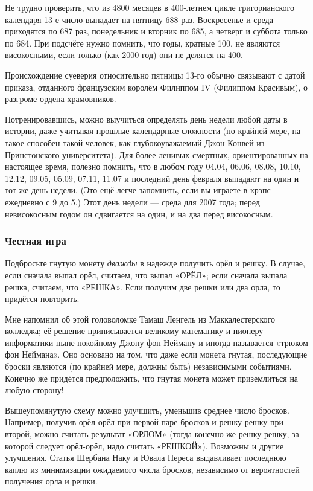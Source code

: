 Не трудно проверить, что из 4800 месяцев в 400-летнем цикле григорианского календаря 13-е число выпадает на пятницу 688 раз.
Воскресенье и среда приходятся по 687 раз, понедельник и вторник по 685, а четверг и суббота только по 684.
При подсчёте нужно помнить, что годы, кратные 100, не являются високосными, если только (как 2000 год) они не делятся на 400.

Происхождение суеверия относительно пятницы 13-го обычно связывают с датой приказа, отданного французским королём Филиппом IV (Филиппом Красивым), о разгроме ордена храмовников.

Потренировавшись, можно выучиться определять день недели любой даты в истории, даже учитывая прошлые календарные сложности
(по крайней мере, на такое способен такой человек, как глубокоуважаемый Джон Конвей из Принстонского университета).
Для более ленивых смертных, ориентированных на настоящее время, полезно помнить, что в любом году
04.04, 06.06, 08.08, 10.10, 12.12, 09.05, 05.09, 07.11, 11.07 и последний день февраля выпадают на один и тот же день недели.
(Это ещё легче запомнить, если вы играете в крэпс ежедневно с 9 до 5.)
Этот день недели --- среда для 2007 года;
перед невисокосным годом он сдвигается на один, и на два перед високосным.

\subsubsection*{Честная игра}

Подбросьте гнутую монету \emph{дважды} в надежде получить орёл и решку.
В случае, если сначала выпал орёл, считаем, что выпал «ОРЁЛ»;
если сначала выпала решка, считаем, что «РЕШКА».
Если получим две решки или два орла, то придётся повторить.

Мне напомнил об этой головоломке Тамаш Ленгель из Маккалестерского колледжа;
её решение приписывается великому математику и пионеру информатики ныне покойному Джону фон Нейману и иногда называется «трюком фон Неймана».
Оно основано на том, что даже если монета гнутая, последующие броски являются (по крайней мере, должны быть) независимыми событиями.
Конечно же придётся предположить, что гнутая монета может приземлиться на любую сторону!

Вышеупомянутую схему можно улучшить, уменьшив среднее число бросков.
Например, получив орёл-орёл при первой паре бросков и решку-решку при второй, можно считать результат «ОРЛОМ» (тогда конечно же решку-решку, за которой следует орёл-орёл, надо считать «РЕШКОЙ»).
Возможны и другие улучшения.
Статья Шербана Наку и Ювала Переса \cite{44} выдавливает последнюю каплю из минимизации ожидаемого числа бросков, независимо от вероятностей получения орла и решки.

